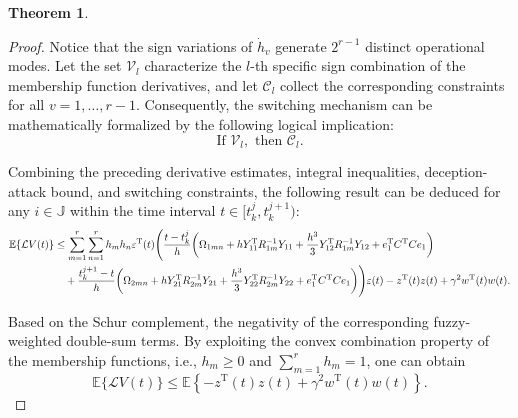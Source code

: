 \documentclass[preprint,review,fleqn,sort&compress,3p]{elsarticle}
\theoremstyle{definition} %
\theoremstyle{definition}%
\newtheorem{thm}{Theorem}[section]
\newif\ifreviewmarkup
\DeclareRobustCommand{\revdel}[1]{\ifreviewmarkup{\color{revisionred}\hypersetup{linkcolor=revisionred,citecolor=revisionred}#1}\fi}
\DeclareRobustCommand{\revadd}[1]{{\ifreviewmarkup\color{revisiongreen}\hypersetup{linkcolor=revisiongreen,citecolor=revisiongreen}\fi#1}}
\begin{document}
\begin{thm}
\begin{proof}
Notice that the sign variations of $\dot{h}_v$ generate $2^{r-1}$ distinct operational modes. Let the set $\mathcal{V}_l$ characterize the $l$-th specific sign combination of the membership function derivatives, and let $\mathcal{C}_l$ collect the corresponding constraints for all $v=1,\ldots,r-1$. Consequently, the switching mechanism can be mathematically formalized by the following logical implication:
\begin{equation}
	\text{If } \mathcal{V}_l, \text{ then } \mathcal{C}_l. \label{eq_if_then_2}
\end{equation}

Combining the preceding derivative estimates, integral inequalities, deception-attack bound, and switching constraints, the following result can be deduced for any $i \in \mathbb{J}$ within the time interval $t \in [t_k^j, t_k^{j+1})$:
\begin{align}
	\mathbb{E}\{\mathcal{L}V(t)\}
	&\leq
	\sum_{m=1}^{r} \sum_{n=1}^{r} h_m h_n \varepsilon^\mathrm{T}(t) \Bigg( 
	\frac{t - t_k^j}{h} \bigg( 
	\Omega_{1mn} 
	+ h  Y_{11}^{\mathrm{T}} R_{1m}^{-1} Y_{11} 
	+ \frac{h^3}{3} Y_{12}^{\mathrm{T}} R_{1m}^{-1} Y_{12}
	+ e_{1}^{\mathrm{T}} C^{\mathrm{T}}C e_1 \bigg) \notag \\
	&\quad + \frac{t_{k}^{j+1} - t}{h} \bigg( 
	\Omega_{2mn} 
	+ h Y_{21}^{\mathrm{T}} R_{2m}^{-1} Y_{21} 
	+ \frac{h^3}{3} Y_{22}^{\mathrm{T}} R_{2m}^{-1} Y_{22}
	+ e_{1}^{\mathrm{T}} C^{\mathrm{T}}C e_1  
	\bigg) \Bigg) \varepsilon(t) 
	- z^{\mathrm{T}}(t)z(t) + \gamma^2 w^{\mathrm{T}}(t)w(t).
\end{align}

\label{rev:M30}Based on the Schur complement, \revdel{condition \eqref{shucr1} guarantee} the negativity of the corresponding fuzzy-weighted double-sum terms. By exploiting the convex combination property of the membership functions, i.e., $h_m \ge 0$ and $\sum_{m=1}^{r} h_m = 1$, one can obtain
\begin{equation}
	\mathbb{E}\{\mathcal{L}V(t)\}
	\leq
	\mathbb{E} \left\{
	-z^{\mathrm{T}}(t)z(t)
	+\gamma^2 w^{\mathrm{T}}(t)w(t)
	\right\}.
\end{equation}


\end{proof}
\end{thm}
\end{document}
